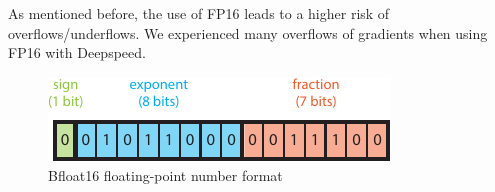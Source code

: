 As mentioned before, the use of FP16 leads to a higher risk of overflows/underflows. We experienced many overflows 
of gradients when using FP16 with Deepspeed. 

\begin{figure}[H]
    \centering
    \includegraphics{figures/mixed_precision/bfloat16.pdf}
    \caption{Bfloat16 floating-point number format}
\end{figure}






